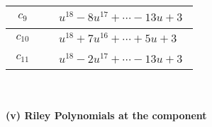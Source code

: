 \documentclass[1p]{elsarticle_modified}
\theoremstyle{definition}
\begin{document}
\begin{tabular}{m{50pt}|m{274pt}}
\hline $$\begin{aligned}c_{9}\end{aligned}$$&$\begin{aligned}
&u^{18}-8 u^{17}+\cdots-13 u+3
\end{aligned}$\\
\hline $$\begin{aligned}c_{10}\end{aligned}$$&$\begin{aligned}
&u^{18}+7 u^{16}+\cdots+5 u+3
\end{aligned}$\\
\hline $$\begin{aligned}c_{11}\end{aligned}$$&$\begin{aligned}
&u^{18}-2 u^{17}+\cdots-13 u+3
\end{aligned}$\\
\hline
\end{tabular}\\~\\
\newpage\renewcommand{\arraystretch}{1}
\flushleft \textbf{(v) Riley Polynomials at the component}\newline \\
\end{document}
